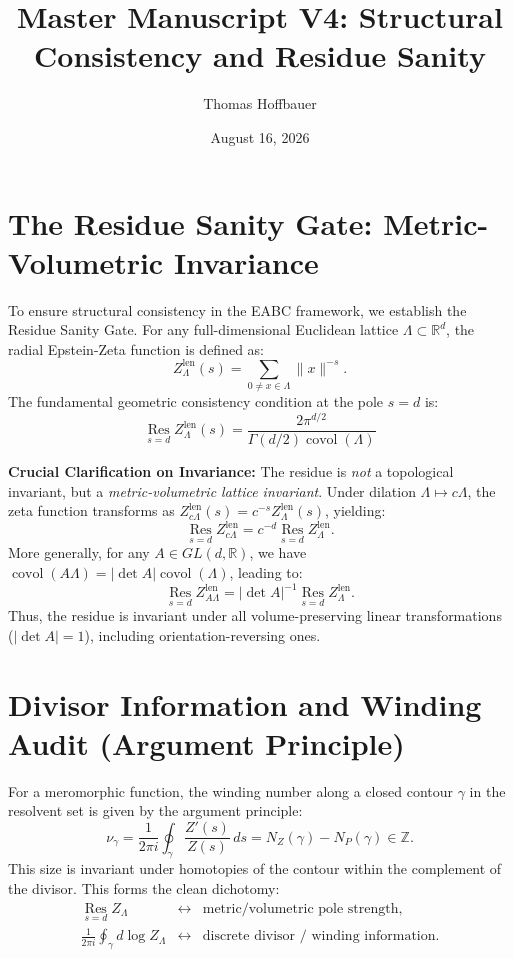 \documentclass{article}
\title{Master Manuscript V4: Structural Consistency and Residue Sanity}
\author{Thomas Hoffbauer}
\date{August 16, 2026}
\begin{document}
\maketitle

\section{The Residue Sanity Gate: Metric-Volumetric Invariance}

To ensure structural consistency in the EABC framework, we establish the Residue Sanity Gate. For any full-dimensional Euclidean lattice $\Lambda \subset \mathbb{R}^d$, the radial Epstein-Zeta function is defined as:
\[
Z_{\Lambda}^{\mathrm{len}}(s) = \sum_{0 \neq x \in \Lambda} \|x\|^{-s}.
\]
The fundamental geometric consistency condition at the pole $s=d$ is:
\begin{equation}
\boxed{\operatorname*{Res}_{s=d} Z_{\Lambda}^{\mathrm{len}}(s) = \frac{2\pi^{d/2}}{\Gamma(d/2)\operatorname{covol}(\Lambda)}}
\end{equation}

\noindent\textbf{Crucial Clarification on Invariance:} 
The residue is \emph{not} a topological invariant, but a \emph{metric-volumetric lattice invariant}. Under dilation $\Lambda \mapsto c\Lambda$, the zeta function transforms as $Z_{c\Lambda}^{\mathrm{len}}(s) = c^{-s}Z_\Lambda^{\mathrm{len}}(s)$, yielding:
\[
\operatorname*{Res}_{s=d} Z_{c\Lambda}^{\mathrm{len}} = c^{-d} \operatorname*{Res}_{s=d} Z_\Lambda^{\mathrm{len}}.
\]
More generally, for any $A \in GL(d, \mathbb{R})$, we have $\operatorname{covol}(A\Lambda) = |\det A|\operatorname{covol}(\Lambda)$, leading to:
\[
\boxed{
\operatorname*{Res}_{s=d} Z_{A\Lambda}^{\mathrm{len}} = |\det A|^{-1} \operatorname*{Res}_{s=d} Z_\Lambda^{\mathrm{len}}.
}
\]
Thus, the residue is invariant under all volume-preserving linear transformations ($|\det A| = 1$), including orientation-reversing ones.

\section{Divisor Information and Winding Audit (Argument Principle)}

For a meromorphic function, the winding number along a closed contour $\gamma$ in the resolvent set is given by the argument principle:
\[
\nu_\gamma = \frac{1}{2\pi i} \oint_\gamma \frac{Z'(s)}{Z(s)}\,ds = N_Z(\gamma) - N_P(\gamma) \in \mathbb{Z}.
\]
This size is invariant under homotopies of the contour within the complement of the divisor. This forms the clean dichotomy:
\[
\begin{array}{rcl}
\operatorname*{Res}_{s=d} Z_\Lambda &\longleftrightarrow& \text{metric/volumetric pole strength}, \\[2mm]
\displaystyle \frac{1}{2\pi i}\oint_\gamma d\log Z_\Lambda &\longleftrightarrow& \text{discrete divisor / winding information}.
\end{array}
\]
\end{document}
